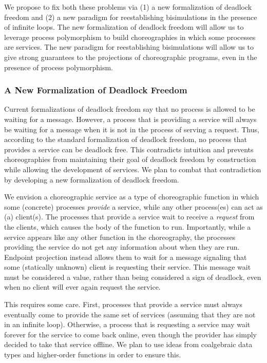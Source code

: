 We propose to fix both these problems via (1) a new formalization of deadlock freedom and (2) a new paradigm for reestablishing bisimulations in the presence of infinite loops.
The new formalization of deadlock freedom will allow us to leverage process polymorphism to build choreographies in which some processes are services.
The new paradigm for reestablishing bisimulations will allow us to give strong guarantees to the projections of choreographic programs, even in the presence of process polymorphism.

\subsubsection{A New Formalization of Deadlock Freedom}
\label{sec:new-form-deadl}

Current formalizations of deadlock freedom say that no process is allowed to be waiting for a message.
However, a process that is providing a service will always be waiting for a message when it is not in the process of serving a request.
Thus, according to the standard formalization of deadlock freedom, no process that provides a service can be deadlock free.
This contradicts intuition and prevents choreographies from maintaining their goal of deadlock freedom by construction while allowing the development of services.
We plan to combat that contradiction by developing a new formalization of deadlock freedom.

We envision a choreographic service as a type of choreographic function in which some (concrete) processes \emph{provide} a service, while any other process(es) can act as (a) client(s).
The processes that provide a service wait to receive a \emph{request} from the clients, which causes the body of the function to run.
Importantly, while a service appears like any other function in the choreography, the processes providing the service do not get any information about when they are run.
Endpoint projection instead allows them to wait for a message signaling that some (statically unknown) client is requesting their service.
This message wait must be considered a value, rather than being considered a sign of deadlock, even when no client will ever again request the service.

This requires some care.
First, processes that provide a service must always eventually come to provide the same set of services (assuming that they are not in an infinite loop).
Otherwise, a process that is requesting a service may wait forever for the service to come back online, even though the provider has simply decided to take that service offline.
We plan to use ideas from coalgebraic data types and higher-order functions in order to ensure this.


